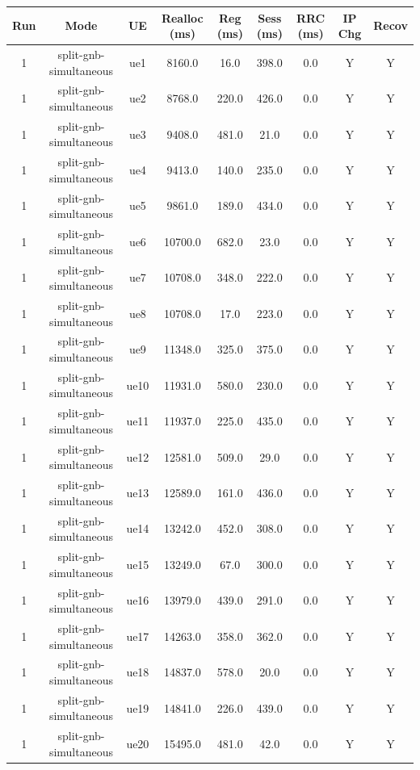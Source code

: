 \begin{table}[ht]
\centering
\begin{tabular}{|c|c|c|c|c|c|c|c|c|}
\hline
Run & Mode & UE & Realloc (ms) & Reg (ms) & Sess (ms) & RRC (ms) & IP Chg & Recov \\
\hline
1 & split-gnb-simultaneous & ue1 & 8160.0 & 16.0 & 398.0 & 0.0 & Y & Y \\
1 & split-gnb-simultaneous & ue2 & 8768.0 & 220.0 & 426.0 & 0.0 & Y & Y \\
1 & split-gnb-simultaneous & ue3 & 9408.0 & 481.0 & 21.0 & 0.0 & Y & Y \\
1 & split-gnb-simultaneous & ue4 & 9413.0 & 140.0 & 235.0 & 0.0 & Y & Y \\
1 & split-gnb-simultaneous & ue5 & 9861.0 & 189.0 & 434.0 & 0.0 & Y & Y \\
1 & split-gnb-simultaneous & ue6 & 10700.0 & 682.0 & 23.0 & 0.0 & Y & Y \\
1 & split-gnb-simultaneous & ue7 & 10708.0 & 348.0 & 222.0 & 0.0 & Y & Y \\
1 & split-gnb-simultaneous & ue8 & 10708.0 & 17.0 & 223.0 & 0.0 & Y & Y \\
1 & split-gnb-simultaneous & ue9 & 11348.0 & 325.0 & 375.0 & 0.0 & Y & Y \\
1 & split-gnb-simultaneous & ue10 & 11931.0 & 580.0 & 230.0 & 0.0 & Y & Y \\
1 & split-gnb-simultaneous & ue11 & 11937.0 & 225.0 & 435.0 & 0.0 & Y & Y \\
1 & split-gnb-simultaneous & ue12 & 12581.0 & 509.0 & 29.0 & 0.0 & Y & Y \\
1 & split-gnb-simultaneous & ue13 & 12589.0 & 161.0 & 436.0 & 0.0 & Y & Y \\
1 & split-gnb-simultaneous & ue14 & 13242.0 & 452.0 & 308.0 & 0.0 & Y & Y \\
1 & split-gnb-simultaneous & ue15 & 13249.0 & 67.0 & 300.0 & 0.0 & Y & Y \\
1 & split-gnb-simultaneous & ue16 & 13979.0 & 439.0 & 291.0 & 0.0 & Y & Y \\
1 & split-gnb-simultaneous & ue17 & 14263.0 & 358.0 & 362.0 & 0.0 & Y & Y \\
1 & split-gnb-simultaneous & ue18 & 14837.0 & 578.0 & 20.0 & 0.0 & Y & Y \\
1 & split-gnb-simultaneous & ue19 & 14841.0 & 226.0 & 439.0 & 0.0 & Y & Y \\
1 & split-gnb-simultaneous & ue20 & 15495.0 & 481.0 & 42.0 & 0.0 & Y & Y \\

\end{tabular}
\end{table}
